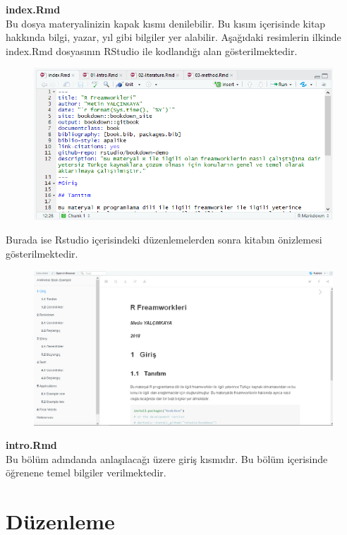 \documentclass[]{book}
\begin{document}
\textbf{index.Rmd}\\
Bu dosya materyalinizin kapak kısmı denilebilir. Bu kısım içerisinde
kitap hakkında bilgi, yazar, yıl gibi bilgiler yer alabilir. Aşağıdaki
resimlerin ilkinde index.Rmd dosyasının RStudio ile kodlandığı alan
gösterilmektedir.

\begin{figure}
\centering
\includegraphics{resim1.png}
\caption{}
\end{figure}

Burada ise Rstudio içerisindeki düzenlemelerden sonra kitabın önizlemesi
gösterilmektedir.

\begin{figure}
\centering
\includegraphics{resim2.png}
\caption{}
\end{figure}

\textbf{intro.Rmd}\\
Bu bölüm adındanda anlaşılacağı üzere giriş kısmıdır. Bu bölüm
içerisinde öğrenene temel bilgiler verilmektedir.

\section{Düzenleme}\label{duzenleme}
\end{document}
